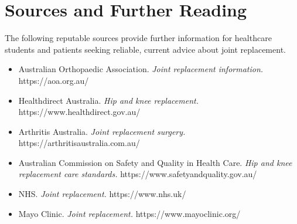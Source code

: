 \section*{Sources and Further Reading}
The following reputable sources provide further information for healthcare students and patients seeking reliable, current advice about joint replacement.
\begin{itemize}
    \item Australian Orthopaedic Association. \textit{Joint replacement information.} https://aoa.org.au/
    \item Healthdirect Australia. \textit{Hip and knee replacement.} https://www.healthdirect.gov.au/
    \item Arthritis Australia. \textit{Joint replacement surgery.} https://arthritisaustralia.com.au/
    \item Australian Commission on Safety and Quality in Health Care. \textit{Hip and knee replacement care standards.} https://www.safetyandquality.gov.au/
    \item NHS. \textit{Joint replacement.} https://www.nhs.uk/
    \item Mayo Clinic. \textit{Joint replacement.} https://www.mayoclinic.org/
\end{itemize}

